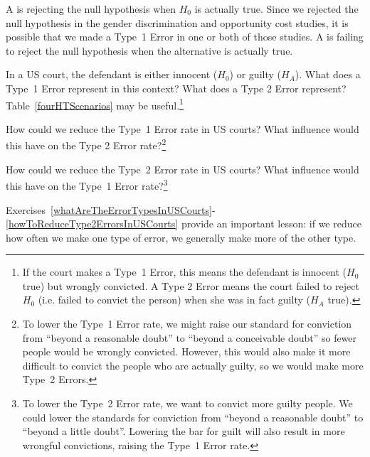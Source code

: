 A  is rejecting the null hypothesis when $H_0$ is actually true. Since we rejected the null hypothesis in the gender discrimination and opportunity cost studies, it is possible that we made a Type~1 Error in one or both of those studies. A  is failing to reject the null hypothesis when the alternative is actually true.

\begin{exercise} \label{whatAreTheErrorTypesInUSCourts}
In a US court, the defendant is either innocent ($H_0$) or  guilty ($H_A$). What does a Type~1 Error represent in this context? What does a Type 2 Error represent? Table~\ref{fourHTScenarios} may be useful.\footnote{If the court makes a Type~1 Error, this means the defendant is innocent ($H_0$ true) but wrongly convicted. A Type 2 Error means the court failed to reject $H_0$ (i.e. failed to convict the person) when she was in fact guilty ($H_A$ true).}
\end{exercise}

\begin{exercise} \label{howToReduceType1ErrorsInUSCourts}
How could we reduce the Type~1 Error rate in US courts? What influence would this have on the Type 2 Error rate?\footnote{To lower the Type~1 Error rate, we might raise our standard for conviction from ``beyond a reasonable doubt'' to ``beyond a conceivable doubt'' so fewer people would be wrongly convicted. However, this would also make it more difficult to convict the people who are actually guilty, so we would make more Type~2 Errors.}
\end{exercise}

\begin{exercise} \label{howToReduceType2ErrorsInUSCourts}
How could we reduce the Type~2 Error rate in US courts? What influence would this have on the Type~1 Error rate?\footnote{To lower the Type~2 Error rate, we want to convict more guilty people. We could lower the standards for conviction from ``beyond a reasonable doubt'' to ``beyond a little doubt''. Lowering the bar for guilt will also result in more wrongful convictions, raising the Type~1 Error rate.}
\end{exercise}


Exercises~\ref{whatAreTheErrorTypesInUSCourts}-\ref{howToReduceType2ErrorsInUSCourts} provide an important lesson: if we reduce how often we make one type of error, we generally make more of the other type.

